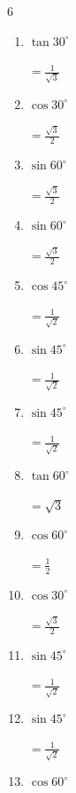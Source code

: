 \begin{multicols}{6}
\begin{enumerate}
        $\displaystyle =\frac{1}{2}$

  \item $\displaystyle \tan{30^\circ}$

        $\displaystyle =\frac{1}{\sqrt{3}}$

  \item $\displaystyle \cos{30^\circ}$

        $\displaystyle =\frac{\sqrt{3}}{2}$

  \item $\displaystyle \sin{60^\circ}$

        $\displaystyle =\frac{\sqrt{3}}{2}$

  \item $\displaystyle \sin{60^\circ}$

        $\displaystyle =\frac{\sqrt{3}}{2}$

  \item $\displaystyle \cos{45^\circ}$

        $\displaystyle =\frac{1}{\sqrt{2}}$

  \item $\displaystyle \sin{45^\circ}$

        $\displaystyle =\frac{1}{\sqrt{2}}$

  \item $\displaystyle \sin{45^\circ}$

        $\displaystyle =\frac{1}{\sqrt{2}}$

\columnbreak %

  \item $\displaystyle \tan{60^\circ}$

        $\displaystyle =\sqrt{3}$

  \item $\displaystyle \cos{60^\circ}$

        $\displaystyle =\frac{1}{2}$

  \item $\displaystyle \cos{30^\circ}$

        $\displaystyle =\frac{\sqrt{3}}{2}$

  \item $\displaystyle \sin{45^\circ}$

        $\displaystyle =\frac{1}{\sqrt{2}}$

  \item $\displaystyle \sin{45^\circ}$

        $\displaystyle =\frac{1}{\sqrt{2}}$

  \item $\displaystyle \cos{60^\circ}$


\end{enumerate}
\end{multicols}
